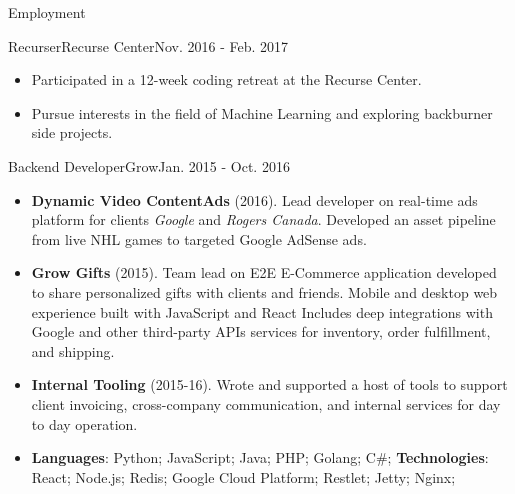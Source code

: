 \documentclass[]{mcdowellcv}
\begin{document}
    \makeheader

    \begin{cvsection}{Employment}

        \begin{cvsubsection}{Recurser}{Recurse Center}{Nov. 2016 - Feb. 2017}
            \begin{itemize}
                \item Participated in a 12-week coding retreat at the Recurse Center.
                \item Pursue interests in the field of Machine Learning and exploring backburner side projects.
            \end{itemize}
        \end{cvsubsection}

        \begin{cvsubsection}{Backend Developer}{Grow}{Jan. 2015 - Oct. 2016}
            \begin{itemize}
                \item \textbf{Dynamic Video ContentAds} (2016). Lead developer on real-time ads platform for clients \textit{Google} and \textit{Rogers Canada}. Developed an asset pipeline from live NHL games to targeted Google AdSense ads.
            \end{itemize}
            \begin{itemize}
                \item \textbf{Grow Gifts} (2015). Team lead on E2E E-Commerce application developed to share personalized gifts with clients and friends. Mobile and desktop web experience built with JavaScript and React Includes deep integrations with Google and other third-party APIs services for inventory, order fulfillment, and shipping.
            \end{itemize}
            \begin{itemize}
                \item \textbf{Internal Tooling} (2015-16). Wrote and supported a host of tools to support client invoicing, cross-company communication, and internal services for day to day operation.
            \end{itemize}
            \begin{itemize}
                 \item \textbf{Languages}:  Python; JavaScript; Java; PHP; Golang; C\#; \newline
                \textbf{Technologies}: React; Node.js; Redis; Google Cloud Platform; Restlet; Jetty; Nginx;
            \end{itemize}
        \end{cvsubsection}


\end{cvsection}
\end{document}

